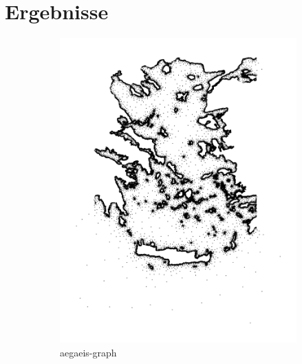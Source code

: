 \chapter{Ergebnisse}


\begin{figure}[ht]
    \centering
    \begin{subfigure}[b]{0.35\textwidth}
        \centering
        \includegraphics[width=\textwidth]{img/base_graphs/aegaeis-ref-graph.png}
        \caption{aegaeis-graph}
    \end{subfigure}
    \hfill
    \begin{subfigure}[b]{0.35\textwidth}
        \centering

\end{subfigure}
\end{figure}
